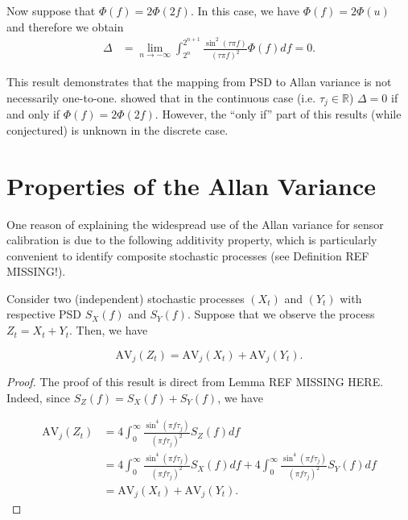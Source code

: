 \documentclass[]{book}
\theoremstyle{definition}
\theoremstyle{definition}
\theoremstyle{definition}
\theoremstyle{remark}
\let\BeginKnitrBlock\begin \let\EndKnitrBlock\end
\begin{document}
Now suppose that \(\Phi(f) = 2 \Phi(2f)\). In this case, we have
\(\Phi(f) = 2 \Phi(u)\) and therefore we obtain \begin{equation*}
    \begin{aligned}
        \Delta &= \lim_{n \rightarrow -\infty} \int_{2^{n}}^{2^{n+1}} \frac{\sin^2\left(\tau \pi f \right)}{\left(\tau \pi f \right)^2} \Phi(f) df = 0.
    \end{aligned}
\end{equation*}

\BeginKnitrBlock{exercise}
\protect\hypertarget{exr:unnamed-chunk-6}{}{\label{exr:unnamed-chunk-6}
}This result demonstrates that the mapping from PSD to Allan variance is
not necessarily one-to-one. \citet{greenhall1998spectral} showed that in
the continuous case (i.e. \(\tau_j \in \mathbb{R}\)) \(\Delta = 0\) if
and only if \(\Phi(f) = 2 \Phi(2f)\). However, the ``only if'' part of
this results (while conjectured) is unknown in the discrete case.
\EndKnitrBlock{exercise}

\hypertarget{properties-of-the-allan-variance}{%
\section{Properties of the Allan
Variance}\label{properties-of-the-allan-variance}}

One reason of explaining the widespread use of the Allan variance for
sensor calibration is due to the following additivity property, which is
particularly convenient to identify composite stochastic processes (see
Definition REF MISSING!).

\BeginKnitrBlock{corollary}[Additivity of the AV]
\protect\hypertarget{cor:coroaddav}{}{\label{cor:coroaddav}
{} }Consider two (independent)
stochastic processes \((X_t)\) and \((Y_t)\) with respective PSD
\(S_X(f)\) and \(S_Y(f)\). Suppose that we observe the process
\(Z_t = X_t + Y_t\). Then, we have

\begin{equation*}
    \text{AV}_j \left(Z_t \right) = \text{AV}_j \left(X_t \right) + \text{AV}_j \left(Y_t \right).
\end{equation*}
\EndKnitrBlock{corollary}

\BeginKnitrBlock{proof}
{}The proof of this result is direct from Lemma
REF MISSING HERE. Indeed, since \(S_Z(f) = S_X(f) + S_Y(f)\), we have

\begin{equation*}
    \begin{aligned}
    \text{AV}_j \left(Z_t \right) &= 4  \int_0^{\infty}  \frac{\sin^4(\pi f \tau_j)}{(\pi f \tau_j)^2} S_{Z}(f) df\\
    &= 4  \int_0^{\infty}  \frac{\sin^4(\pi f \tau_j)}{(\pi f \tau_j)^2} S_{X}(f) df + 4  \int_0^{\infty}  \frac{\sin^4(\pi f \tau_j)}{(\pi f \tau_j)^2} S_{Y}(f) df\\
    &= \text{AV}_j \left(X_t \right) + \text{AV}_j \left(Y_t \right).
    \end{aligned}
\end{equation*}
\EndKnitrBlock{proof}
\end{document}
